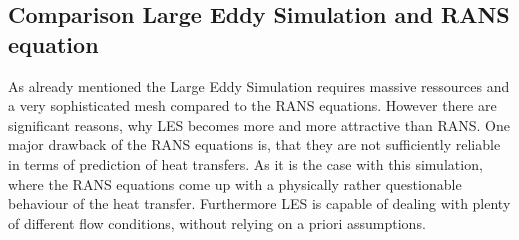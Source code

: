 \subsection{Comparison Large Eddy Simulation and RANS equation}
As already mentioned the Large Eddy Simulation requires massive ressources and a very sophisticated mesh compared to the RANS equations. However there are significant reasons, why LES becomes more and more attractive than RANS. One major drawback of the RANS equations is, that they are not sufficiently reliable in terms of prediction of heat transfers. As it is the case with this simulation, where the RANS equations come up with a physically rather questionable behaviour of the heat transfer. 
Furthermore LES is capable of dealing with plenty of different flow conditions, without relying on a priori assumptions.

